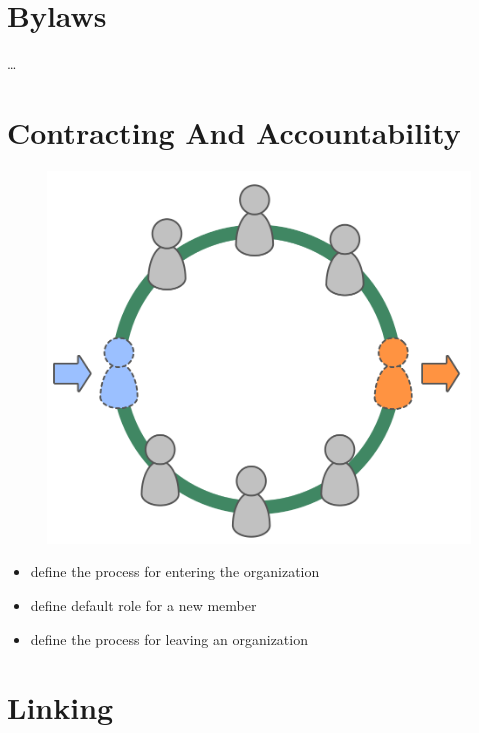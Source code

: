 \section{Bylaws}
\label{bylaws}

{\ldots}

\section{Contracting And Accountability}
\label{contractingandaccountability}

\begin{figure}[htbp]
\centering
\includegraphics[keepaspectratio,width=\textwidth,height=0.75\textheight]{img/circle/enter-leave-circle.png}
\end{figure}

\begin{itemize}
\item define the process for entering the organization

\item define default role for a new member

\item define the process for leaving an organization

\end{itemize}

\section{Linking}
\label{linking}

